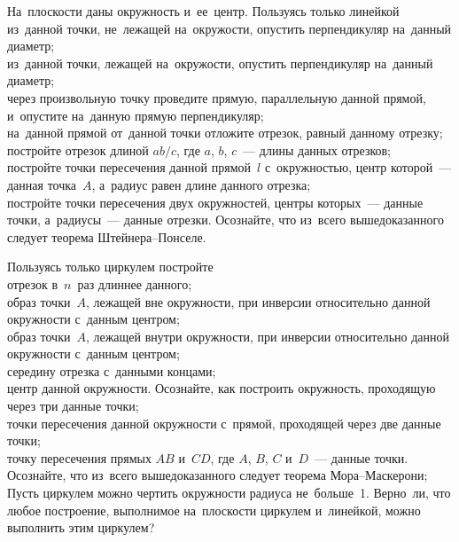 \begin{problems}

\item
На~плоскости даны окружность и~ее~центр.
Пользуясь только линейкой
\\
\subproblem
из~данной точки, не~лежащей на~окружости, опустить перпендикуляр на~данный
диаметр;
\\
\subproblem
из~данной точки, лежащей на~окружости, опустить перпендикуляр на~данный
диаметр;
\\
\subproblem
через произвольную точку проведите прямую, параллельную данной прямой,
и~опустите на~данную прямую перпендикуляр;
\\
\subproblem
на~данной прямой от~данной точки отложите отрезок, равный данному отрезку;
\\
\subproblem
постройте отрезок длиной $a b / c$, где $a$, $b$, $c$~--- длины данных отрезков;
\\
\subproblem
постройте точки пересечения данной прямой~$l$ с~окружностью, центр которой~---
данная точка~$A$, а~радиус равен длине данного отрезка;
\\
\subproblem
постройте точки пересечения двух окружностей, центры которых~--- данные точки,
а~радиусы~--- данные отрезки.
Осознайте, что из~всего вышедоказанного следует теорема Штейнера--Понселе.

\item
Пользуясь только циркулем постройте
\\
\subproblem
отрезок в~$n$~раз длиннее данного;
\\
\subproblem
образ точки~$A$, лежащей вне окружности, при инверсии относительно данной
окружности с~данным центром;
\\
\subproblem
образ точки~$A$, лежащей внутри окружности, при инверсии относительно данной
окружности с~данным центром;
\\
\subproblem
середину отрезка с~данными концами;
\\
\subproblem
центр данной окружности.
Осознайте, как построить окружность, проходящую через три данные точки;
\\
\subproblem
точки пересечения данной окружности с~прямой, проходящей через две данные
точки;
\\
\subproblem
точку пересечения прямых $AB$ и~$CD$, где $A$, $B$, $C$ и~$D$~--- данные точки.
Осознайте, что из~всего вышедоказанного следует теорема Мора--Маскерони;
\\
\subproblem
Пусть циркулем можно чертить окружности радиуса не~больше~1.
Верно~ли, что любое построение, выполнимое на~плоскости циркулем и~линейкой,
можно выполнить этим циркулем?


\end{problems}

